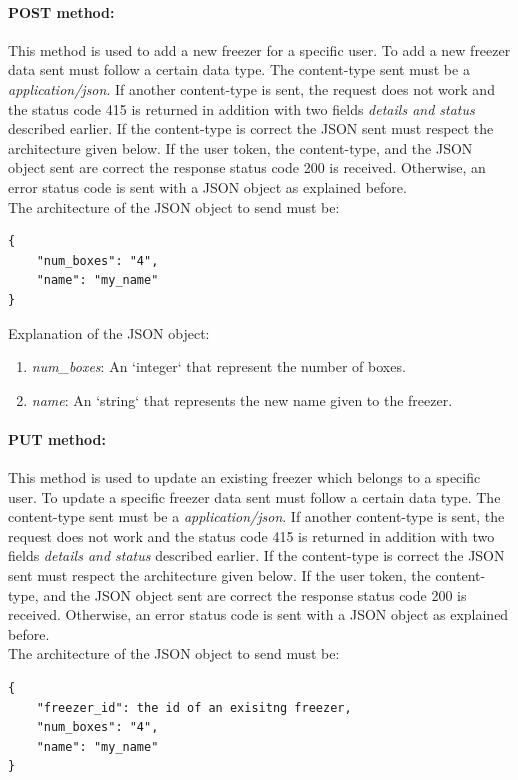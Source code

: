 \paragraph{POST method:} This method is used to add a new freezer for a specific user. To add a new freezer data sent must follow a certain data type. The content-type sent must be a \textit{application/json}. If another content-type is sent, the request does not work and the status code 415 is returned in addition with two fields \textit{details and status} described earlier. If the  content-type is correct the JSON sent must respect the architecture given below. If the user token, the  content-type, and the JSON object sent are correct the response status code 200 is received. Otherwise, an error status code is sent with a JSON object as explained before.\\

The architecture of the JSON object to send must be:
\begin{lstlisting}
{
    "num_boxes": "4",
    "name": "my_name"
}
\end{lstlisting}

Explanation of the  JSON object:
\begin{enumerate}
\item \textit{num\_boxes}: An `integer` that represent the number of boxes.
\item \textit{name}: An `string` that represents the new name given to the freezer.
\end{enumerate}

\paragraph{PUT method:} This method is used to update an existing freezer which belongs to a specific user. To update a specific freezer data sent must follow a certain data type. The content-type sent must be a \textit{application/json}. If another content-type is sent, the request does not work and the status code 415 is returned in addition with two fields \textit{details and status} described earlier. If the  content-type is correct the JSON sent must respect the architecture given below. If the user token, the  content-type, and the JSON object sent are correct the response status code 200 is received. Otherwise, an error status code is sent with a JSON object as explained before.\\

The architecture of the JSON object to send must be:
\begin{lstlisting}
{
    "freezer_id": the id of an exisitng freezer,
    "num_boxes": "4",
    "name": "my_name"
}
\end{lstlisting}

